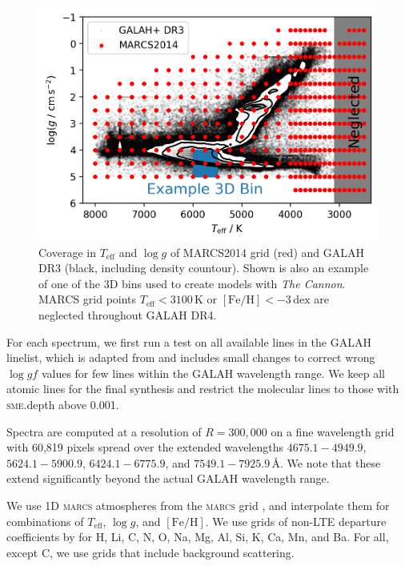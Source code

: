 \documentclass[
  journal=pasa,
  manuscript=research-paper, %
  year=2023,
  volume=37
]{cup-journal}
\newcommand{\SB}[1]{{\textcolor{purple}{#1}}}
\newcommand{\Teff}{$T_\mathrm{eff}$\xspace}
\newcommand{\logg}{$\log g$\xspace}
\newcommand{\feh}{$\mathrm{[Fe/H]}$\xspace}
\newcommand{\TheCannon}{\textit{The Cannon}\xspace}
\newcommand{\marcs}{\textsc{marcs}\xspace}
\newcommand{\dex}{\,\mathrm{dex}}	%
\newcommand{\K}{\,\mathrm{K}}	%
\newcommand{\Angstroem}{\,\text{\AA}}	%
\begin{document}

\begin{figure}[hbt]
 \centering
 \includegraphics[width=\textwidth]{figures/teff_logg_grid_coverage.png}
 \caption{Coverage in \Teff and \logg of MARCS2014 grid (red) and GALAH DR3 (black, including density countour). Shown is also an example of one of the 3D bins used to create models with \TheCannon. MARCS grid points \Teff$ < 3100\K$ or \feh$<-3\dex$ are neglected throughout GALAH DR4.}
 \label{fig:teff_logg_grid_coverage}
\end{figure}

For each spectrum, we first run a test on all available lines in the GALAH linelist, which is adapted from \citet{Heiter2021} and includes small changes to correct wrong $\log gf$ values for few lines within the GALAH wavelength range. We keep all atomic lines for the final synthesis and restrict the molecular lines to those with \textsc{sme}.depth above 0.001.

Spectra are computed at a resolution of $R = 300,000$ on a fine wavelength grid with 60,819 pixels spread over the extended wavelengths $4675.1- 4949.9$, $5624.1-5900.9$, $6424.1-6775.9$, and $7549.1-7925.9 \Angstroem$. We note that these extend significantly beyond the actual GALAH wavelength range.

We use 1D \marcs atmospheres from the \marcs grid \citep[][version 2014]{Gustafsson2008}, and interpolate them for combinations of \Teff, \logg, and \feh. We use grids of non-LTE departure coefficients by \citet{Amarsi2020} for H, Li, C, N, O, Na, Mg, Al, Si, K, Ca, Mn, and Ba. For all, except C, we use grids that include background scattering.
\end{document}
